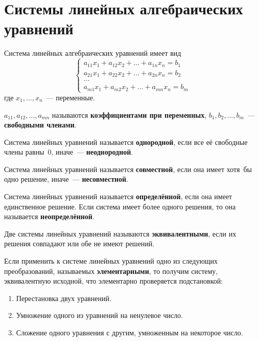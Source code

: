 \section{Системы линейных алгебраических уравнений}
Система линейных алгебраических уравнений имеет вид
\begin{equation*}
\begin{cases}
a_{11} x_1 + a_{12} x_2 + \dots + a_{1n} x_n = b_1 \\
a_{21} x_1 + a_{22} x_2 + \dots + a_{2n} x_n = b_2 \\
\ldots \\
a_{m1} x_1 + a_{m2} x_2 + \dots + a_{mn} x_n = b_m
\end{cases}
\end{equation*}
где $x_1, \ldots, x_n$~--- переменные.

$a_{11}, a_{12}, \ldots, a_{mn}$ называются \textbf{коэффициентами при переменных}, $b_1, b_2, \dots, b_m$~--- \textbf{свободными членами}.

Система линейных уравнений называется \textbf{однородной}, если все её свободные члены равны~$0$, иначе~--- \textbf{неоднородной}.

Система линейных уравнений называется \textbf{совместной}, если она имеет хотя~бы одно решение, иначе~--- \textbf{несовместной}.

Система линейных уравнений называется \textbf{определённой}, если она имеет единственное решение.
Если система имеет более одного решения, то она называется \textbf{неопределённой}.

Две системы линейных уравнений называются \textbf{эквивалентными}, если их решения совпадают или обе не имеют решений.

Если применить к системе линейных уравнений одно из следующих преобразований, называемых \textbf{элементарными}, то получим систему, эквивалентную исходной, что элементарно проверяется подстановкой:
\begin{enumerate}
	\item Перестановка двух уравнений.
	\item Умножение одного из уравнений на ненулевое число.
	\item Сложение одного уравнения с другим, умноженным на некоторое число.
\end{enumerate}

